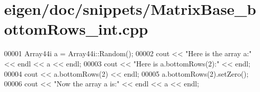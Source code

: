 \hypertarget{eigen_2doc_2snippets_2_matrix_base__bottom_rows__int_8cpp_source}{}\section{eigen/doc/snippets/\+Matrix\+Base\+\_\+bottom\+Rows\+\_\+int.cpp}
\label{eigen_2doc_2snippets_2_matrix_base__bottom_rows__int_8cpp_source}

\begin{DoxyCode}
00001 Array44i a = Array44i::Random();
00002 cout << \textcolor{stringliteral}{"Here is the array a:"} << endl << a << endl;
00003 cout << \textcolor{stringliteral}{"Here is a.bottomRows(2):"} << endl;
00004 cout << a.bottomRows(2) << endl;
00005 a.bottomRows(2).setZero();
00006 cout << \textcolor{stringliteral}{"Now the array a is:"} << endl << a << endl;
\end{DoxyCode}
